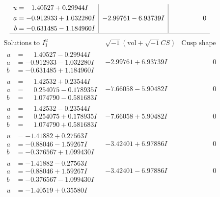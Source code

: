 \documentclass[1p]{elsarticle_modified}
\theoremstyle{definition}
\newcommand{\I}{\sqrt{-1}}
\begin{document}
$$\begin{array}{c|c|c}
\begin{aligned}
u &= \phantom{-}1.40527 + 0.29944 I \\
a &= -0.912933 + 1.032280 I \\
b &= -0.631485 - 1.184960 I\end{aligned}
 & -2.99761 - 6.93739 I & \phantom{-0.000000 } 0\\
 \hline 
 \end{array}$$\newpage$$\begin{array}{c|c|c}  
\text{Solutions to }I^u_{1}& \I (\text{vol} + \sqrt{-1}CS) & \text{Cusp shape}\\
 \hline 
\begin{aligned}
u &= \phantom{-}1.40527 - 0.29944 I \\
a &= -0.912933 - 1.032280 I \\
b &= -0.631485 + 1.184960 I\end{aligned}
 & -2.99761 + 6.93739 I & \phantom{-0.000000 } 0 \\ \hline\begin{aligned}
u &= \phantom{-}1.42532 + 0.23544 I \\
a &= \phantom{-}0.254075 - 0.178935 I \\
b &= \phantom{-}1.074790 - 0.581683 I\end{aligned}
 & -7.66058 - 5.90482 I & \phantom{-0.000000 } 0 \\ \hline\begin{aligned}
u &= \phantom{-}1.42532 - 0.23544 I \\
a &= \phantom{-}0.254075 + 0.178935 I \\
b &= \phantom{-}1.074790 + 0.581683 I\end{aligned}
 & -7.66058 + 5.90482 I & \phantom{-0.000000 } 0 \\ \hline\begin{aligned}
u &= -1.41882 + 0.27563 I \\
a &= -0.88046 - 1.59267 I \\
b &= -0.376567 + 1.099430 I\end{aligned}
 & -3.42401 + 6.97886 I & \phantom{-0.000000 } 0 \\ \hline\begin{aligned}
u &= -1.41882 - 0.27563 I \\
a &= -0.88046 + 1.59267 I \\
b &= -0.376567 - 1.099430 I\end{aligned}
 & -3.42401 - 6.97886 I & \phantom{-0.000000 } 0 \\ \hline\begin{aligned}
u &= -1.40519 + 0.35580 I \\

\end{aligned}
\end{array}$$
\end{document}
